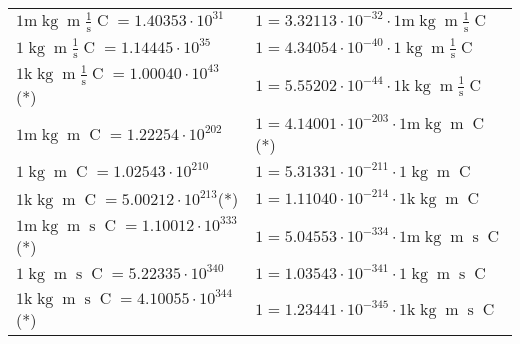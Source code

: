 \begin{center}
\begin{longtable}{l l}
{\color{gray}$1 \bm{\mathrm{ m}}\operatorname{kg}{\operatorname{m}}\frac1{\operatorname{s}}{\operatorname{C}}{} = 1.40353\cdot10^{31} $}   & {\color{gray}$ 1 = 3.32113\cdot10^{-32} \cdot 1 \bm{\mathrm{ m}}\operatorname{kg}{\operatorname{m}}\frac1{\operatorname{s}}{\operatorname{C}}{}$}  \\
{\color{black}$1 \bm{\mathrm{ }}\operatorname{kg}{\operatorname{m}}\frac1{\operatorname{s}}{\operatorname{C}}{} = 1.14445\cdot10^{35} $}   & {\color{black}$ 1 = 4.34054\cdot10^{-40} \cdot 1 \bm{\mathrm{ }}\operatorname{kg}{\operatorname{m}}\frac1{\operatorname{s}}{\operatorname{C}}{}$}  \\
{\color{gray}$1 \bm{\mathrm{ k}}\operatorname{kg}{\operatorname{m}}\frac1{\operatorname{s}}{\operatorname{C}}{} = 1.00040\cdot10^{43} $}\quad(*) & {\color{gray}$ 1 = 5.55202\cdot10^{-44} \cdot 1 \bm{\mathrm{ k}}\operatorname{kg}{\operatorname{m}}\frac1{\operatorname{s}}{\operatorname{C}}{}$}  \\
{\color{gray}$1 \bm{\mathrm{ m}}\operatorname{kg}{\operatorname{m}}{}{\operatorname{C}}{} = 1.22254\cdot10^{202} $}   & {\color{gray}$ 1 = 4.14001\cdot10^{-203} \cdot 1 \bm{\mathrm{ m}}\operatorname{kg}{\operatorname{m}}{}{\operatorname{C}}{}$}\quad(*)\\
{\color{black}$1 \bm{\mathrm{ }}\operatorname{kg}{\operatorname{m}}{}{\operatorname{C}}{} = 1.02543\cdot10^{210} $}   & {\color{black}$ 1 = 5.31331\cdot10^{-211} \cdot 1 \bm{\mathrm{ }}\operatorname{kg}{\operatorname{m}}{}{\operatorname{C}}{}$}  \\
{\color{gray}$1 \bm{\mathrm{ k}}\operatorname{kg}{\operatorname{m}}{}{\operatorname{C}}{} = 5.00212\cdot10^{213} $}\quad(*) & {\color{gray}$ 1 = 1.11040\cdot10^{-214} \cdot 1 \bm{\mathrm{ k}}\operatorname{kg}{\operatorname{m}}{}{\operatorname{C}}{}$}  \\
{\color{gray}$1 \bm{\mathrm{ m}}\operatorname{kg}{\operatorname{m}}{\operatorname{s}}{\operatorname{C}}{} = 1.10012\cdot10^{333} $}\quad(*) & {\color{gray}$ 1 = 5.04553\cdot10^{-334} \cdot 1 \bm{\mathrm{ m}}\operatorname{kg}{\operatorname{m}}{\operatorname{s}}{\operatorname{C}}{}$}  \\
{\color{black}$1 \bm{\mathrm{ }}\operatorname{kg}{\operatorname{m}}{\operatorname{s}}{\operatorname{C}}{} = 5.22335\cdot10^{340} $}   & {\color{black}$ 1 = 1.03543\cdot10^{-341} \cdot 1 \bm{\mathrm{ }}\operatorname{kg}{\operatorname{m}}{\operatorname{s}}{\operatorname{C}}{}$}  \\
{\color{gray}$1 \bm{\mathrm{ k}}\operatorname{kg}{\operatorname{m}}{\operatorname{s}}{\operatorname{C}}{} = 4.10055\cdot10^{344} $}\quad(*) & {\color{gray}$ 1 = 1.23441\cdot10^{-345} \cdot 1 \bm{\mathrm{ k}}\operatorname{kg}{\operatorname{m}}{\operatorname{s}}{\operatorname{C}}{}$}  \\

\end{longtable}
\end{center}
